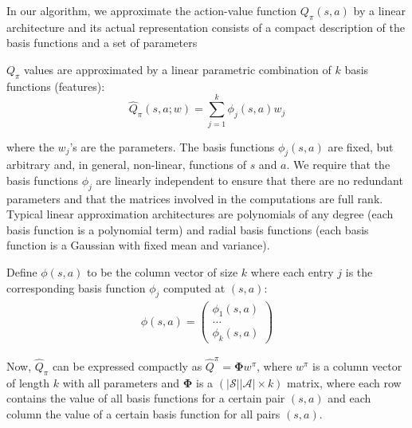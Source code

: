 \documentclass[9pt]{beamer} %
\begin{document}
\begin{frame}
In our algorithm, we approximate the action-value function $Q_{\pi}(s, a)$ by a linear architecture and its actual representation consists of a compact
description of the basis functions and a set of parameters

$Q_{\pi}$ values are approximated by a linear parametric combination of
$k$ basis functions (features):
\begin{equation}
\hat{Q}_{\pi}(s,a; w) = \sum_{j=1}^k \phi_j (s,a) w_j
\end{equation}

where the $w_j$’s are the parameters. The basis functions $\phi_j (s,a)$ are fixed, but arbitrary and, in general, non-linear, functions of $s$ and $a$. We require that the basis functions $\phi_j$ are linearly independent to ensure that there are no redundant parameters and that the matrices involved in the computations are full rank. Typical linear approximation architectures are polynomials of any degree (each basis function is a polynomial term) and
radial basis functions (each basis function is a Gaussian with fixed mean and variance).

Define $\phi(s,a)$ to be the column vector of size $k$ where each entry $j$ is the corresponding basis function $\phi_j$ computed at $(s,a)$:
\begin{align}
\phi(s,a) =
 \begin{pmatrix}
  \phi_1(s,a) \\
  \ldots \\
  \phi_k(s,a) 
 \end{pmatrix}
\end{align}

Now, $\hat{Q}_{\pi}$ can be expressed compactly as $\hat{Q}^{\pi} = \mathbf{\Phi}w^{\pi}$, where $w^{\pi}$ is a column vector of length $k$ with all parameters and $\mathbf{\Phi}$ is a $(|\mathcal{S}||\mathcal{A}| × k)$ matrix, where each row contains the value of all basis functions for a certain pair $(s,a)$ and each column the value of a certain basis function for all pairs $(s,a)$.
\end{frame}
\end{document}
